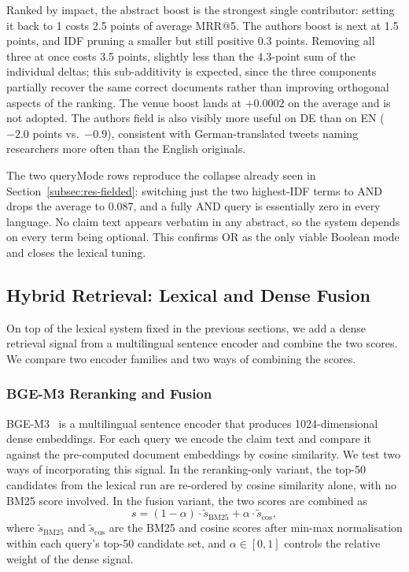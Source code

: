 Ranked by impact, the abstract boost is the strongest single contributor: setting it back to 1 costs 2.5 points of average MRR@5. The authors boost is next at 1.5 points, and IDF pruning a smaller but still positive 0.3 points. Removing all three at once costs 3.5 points, slightly less than the 4.3-point sum of the individual deltas; this sub-additivity is expected, since the three components partially recover the same correct documents rather than improving orthogonal aspects of the ranking. The venue boost lands at $+0.0002$ on the average and is not adopted. The authors field is also visibly more useful on DE than on EN ($-2.0$ points vs.\ $-0.9$), consistent with German-translated tweets naming researchers more often than the English originals.

The two queryMode rows reproduce the collapse already seen in Section~\ref{subsec:res-fielded}: switching just the two highest-IDF terms to AND drops the average to 0.087, and a fully AND query is essentially zero in every language. No claim text appears verbatim in any abstract, so the system depends on every term being optional. This confirms OR as the only viable Boolean mode and closes the lexical tuning.

\subsection{Hybrid Retrieval: Lexical and Dense Fusion}
\label{subsec:res-hybrid}

On top of the lexical system fixed in the previous sections, we add a dense retrieval signal from a multilingual sentence encoder and combine the two scores. We compare two encoder families and two ways of combining the scores.

\subsubsection{BGE-M3 Reranking and Fusion}

BGE-M3~\cite{chen2024bge} is a multilingual sentence encoder that produces 1024-dimensional dense embeddings. For each query we encode the claim text and compare it against the pre-computed document embeddings by cosine similarity. We test two ways of incorporating this signal. In the reranking-only variant, the top-50 candidates from the lexical run are re-ordered by cosine similarity alone, with no BM25 score involved. In the fusion variant, the two scores are combined as
\begin{equation}
    s = (1-\alpha)\cdot\widetilde{s}_{\mathrm{BM25}} + \alpha\cdot\widetilde{s}_{\mathrm{cos}},
    \label{eq:fusion}
\end{equation}
where $\widetilde{s}_{\mathrm{BM25}}$ and $\widetilde{s}_{\mathrm{cos}}$ are the BM25 and cosine scores after min-max normalisation within each query's top-50 candidate set, and $\alpha \in [0,1]$ controls the relative weight of the dense signal.

